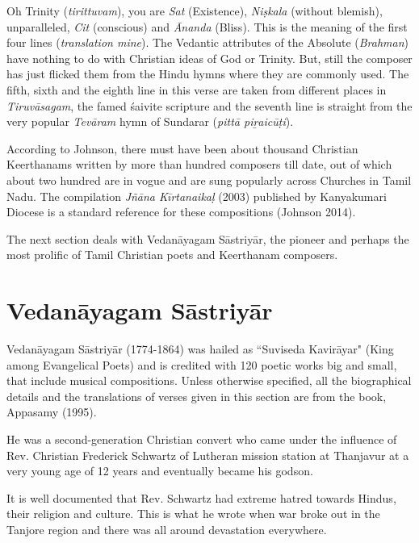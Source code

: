Oh Trinity (\textit{tirittuvam}), you are \textit{Sat} (Existence), \textit{Niṣkala} (without blemish), unparalleled, \textit{Cit} (conscious) and \textit{Ānanda} (Bliss). This is the meaning of the first four lines (\textit{translation mine}). The Vedantic attributes of the Absolute (\textit{Brahman}) have nothing to do with Christian ideas of God or Trinity. But, still the composer has just flicked them from the Hindu hymns where they are commonly used. The fifth, sixth and the eighth line in this verse are taken from different places in \textit{Tiruvāsagam}, the famed śaivite scripture and the seventh line is straight from the very popular \textit{Tevāram} hymn of Sundarar (\textit{pittā piṟaicūṭ­i}).

According to Johnson, there must have been about thousand Christian Keerthanams written by more than hundred composers till date, out of which about two hundred are in vogue and are sung popularly across Churches in Tamil Nadu. The compilation \textit{Jñāna Kīrtanaikaḷ} (2003) published by Kanyakumari Diocese is a standard reference for these compositions (Johnson 2014).

The next section deals with Vedanāyagam Sāstriyār, the pioneer and perhaps the most prolific of Tamil Christian poets and Keerthanam composers.


\section*{Vedanāyagam Sāstriyār}

Vedanāyagam Sāstriyār (1774-1864) was hailed as ``Suviseda Kavirāyar" (King among Evangelical Poets) and is credited with 120 poetic works big and small, that include musical compositions. Unless otherwise specified, all the biographical details and the translations of verses given in this section are from the book, Appasamy (1995).

He was a second-generation Christian convert who came under the influence of Rev. Christian Frederick Schwartz of Lutheran mission station at Thanjavur at a very young age of 12 years and eventually became his godson.

It is well documented that Rev. Schwartz had extreme hatred towards Hindus, their religion and culture. This is what he wrote when war broke out in the Tanjore region and there was all around devastation everywhere.

